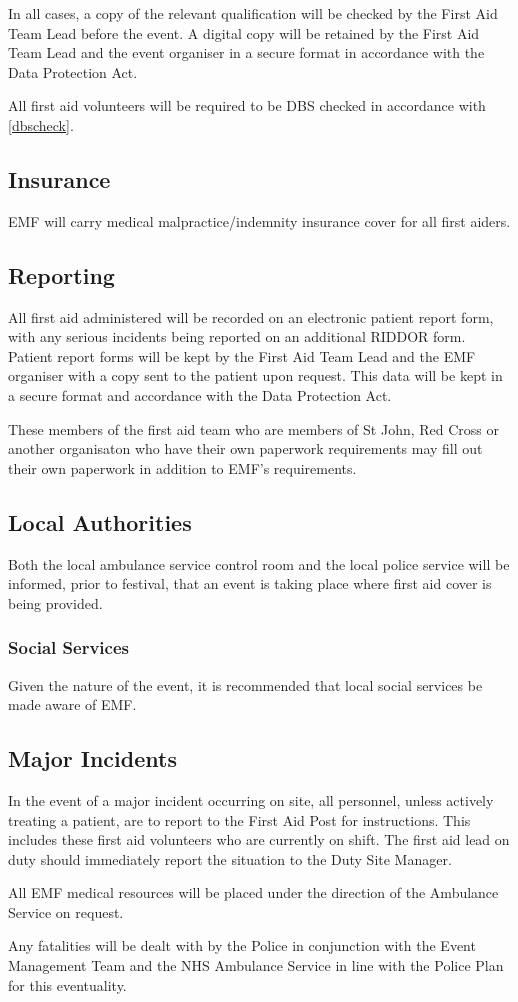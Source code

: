 In all cases, a copy of the relevant qualification will be checked by the
First Aid Team Lead before the event. A digital copy will be retained by the
First Aid Team Lead and the event organiser in a secure format in accordance
with the Data Protection Act.

All first aid volunteers will be required to be DBS checked in accordance with
\cref{dbscheck}.

\subsection{Insurance}
EMF will carry medical malpractice/indemnity insurance cover for all first aiders.

\subsection{Reporting}
All first aid administered will be recorded on an electronic
patient report form, with any serious incidents being reported on an
additional RIDDOR form. Patient report forms will be kept by the First Aid Team
Lead and the EMF organiser with a copy sent to the patient upon request. This
data will be kept in a secure format and accordance with the Data Protection
Act.

These members of the first aid team who are members of St John, Red Cross or another
organisaton who have their own paperwork requirements may fill out their own paperwork
in addition to EMF's requirements.

\subsection{Local Authorities}
Both the local ambulance service control room and the local police service will
be informed, prior to festival, that an event is taking place where first aid
cover is being provided.

\subsubsection{Social Services}

Given the nature of the event, it is recommended that local social services be
made aware of EMF.

\subsection{Major Incidents}

In the event of a major incident occurring on site, all personnel, unless
actively treating a patient, are to report to the First Aid Post for
instructions. This includes these first aid volunteers who are currently on
shift. The first aid lead on duty should immediately report the situation to the
Duty Site Manager.

All EMF medical resources will be placed under the direction of the Ambulance
Service on request.

Any fatalities will be dealt with by the Police in conjunction with the Event
Management Team and the NHS Ambulance Service in line with the Police Plan for
this eventuality.
